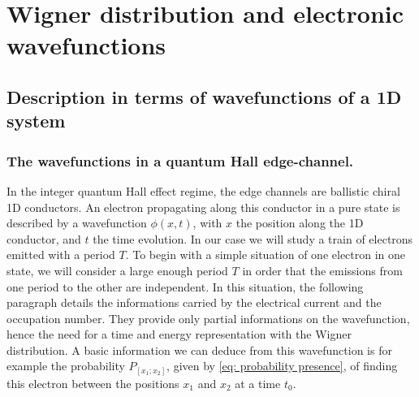 \section{\texorpdfstring{Wigner distribution and electronic wavefunctions}{Wigner distribution and electronic wavefunctions} \label{sec: Wigner distribution and electronic wavefunctions}}

\subsection{Description in terms of wavefunctions of a 1D system}

\subsubsection*{The wavefunctions in a quantum Hall edge-channel.}

In the integer quantum Hall effect regime, the edge channels are ballistic chiral 1D conductors.
An electron propagating along this conductor in a pure state is described by a wavefunction $\phi\left(x,t\right)$, with $x$ the position along the 1D conductor, and $t$ the time evolution.
In our case we will study a train of electrons emitted with a period $T$.
To begin with a simple situation of one electron in one state, we will consider a large enough period $T$ in order that the emissions from one period to the other are independent.
In this situation, the following paragraph details the informations carried by the electrical current and the occupation number.
They provide only partial informations on the wavefunction, hence the need for a time and energy representation with the Wigner distribution.
A basic information we can deduce from this wavefunction is for example the probability $P_{\left[x_{1}; x_{2}\right]} $, given by \eqref{eq: probability presence}, of finding this electron between the positions $x_{1}$ and $x_{2}$ at a time $t_{0}$. 


